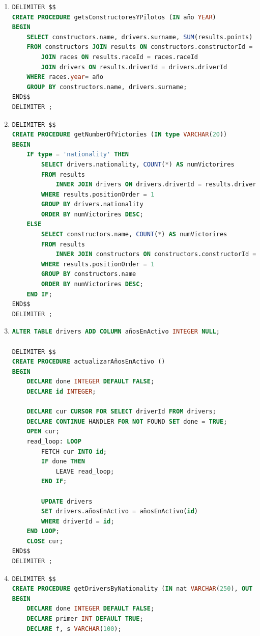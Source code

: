 \documentclass{db-practice}
\begin{document}
\begin{enumerate}
\item
\begin{lstlisting}[language=SQL]
DELIMITER $$
CREATE PROCEDURE getsConstructoresYPilotos (IN año YEAR)
BEGIN
    SELECT constructors.name, drivers.surname, SUM(results.points)
    FROM constructors JOIN results ON constructors.constructorId = results.constructorID
        JOIN races ON results.raceId = races.raceId
        JOIN drivers ON results.driverId = drivers.driverId
    WHERE races.year= año
    GROUP BY constructors.name, drivers.surname;
END$$ 
DELIMITER ;
\end{lstlisting}

\item
\begin{lstlisting}[language=SQL]
DELIMITER $$
CREATE PROCEDURE getNumberOfVictories (IN type VARCHAR(20)) 
BEGIN
    IF type = 'nationality' THEN
        SELECT drivers.nationality, COUNT(*) AS numVictorires
        FROM results
            INNER JOIN drivers ON drivers.driverId = results.driverId
        WHERE results.positionOrder = 1
        GROUP BY drivers.nationality
        ORDER BY numVictorires DESC;
    ELSE 
        SELECT constructors.name, COUNT(*) AS numVictorires
        FROM results
            INNER JOIN constructors ON constructors.constructorId = results.constructorId
        WHERE results.positionOrder = 1
        GROUP BY constructors.name
        ORDER BY numVictorires DESC;
    END IF;
END$$
DELIMITER ;  
\end{lstlisting}

\item
\begin{lstlisting}[language=SQL]
ALTER TABLE drivers ADD COLUMN añosEnActivo INTEGER NULL;

DELIMITER $$
CREATE PROCEDURE actualizarAñosEnActivo ()
BEGIN
    DECLARE done INTEGER DEFAULT FALSE;
    DECLARE id INTEGER;
    
    DECLARE cur CURSOR FOR SELECT driverId FROM drivers;
    DECLARE CONTINUE HANDLER FOR NOT FOUND SET done = TRUE;
    OPEN cur;
    read_loop: LOOP
        FETCH cur INTO id;
        IF done THEN
            LEAVE read_loop;
        END IF;
        
        UPDATE drivers
        SET drivers.añosEnActivo = añosEnActivo(id)
        WHERE driverId = id;
    END LOOP;
    CLOSE cur;
END$$
DELIMITER ;
\end{lstlisting}

\item
\begin{lstlisting}[language=SQL]
DELIMITER $$
CREATE PROCEDURE getDriversByNationality (IN nat VARCHAR(250), OUT drvs TEXT)
BEGIN
    DECLARE done INTEGER DEFAULT FALSE;
    DECLARE primer INT DEFAULT TRUE;
    DECLARE f, s VARCHAR(100);


\end{lstlisting}
\end{enumerate}
\end{document}
